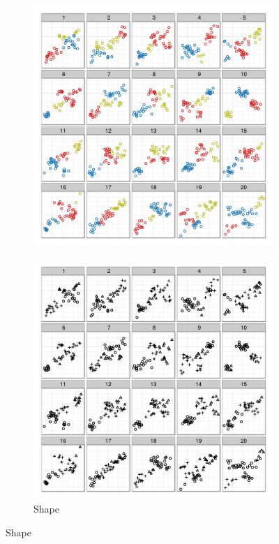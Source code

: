 \documentclass[11pt]{isuthesis}\usepackage[]{graphicx}\usepackage[]{color}
\begin{document}
\begin{figure}[ht]
\begin{subfigure}[t]{0.28\linewidth}
  \includegraphics[width=\linewidth]{fig-samplepics-2}
\end{subfigure}
\begin{subfigure}[t]{0.28\linewidth}
  \caption{Shape}
  \includegraphics[width=\linewidth]{fig-samplepics-3}

\end{subfigure}
\end{figure}
\end{document}
